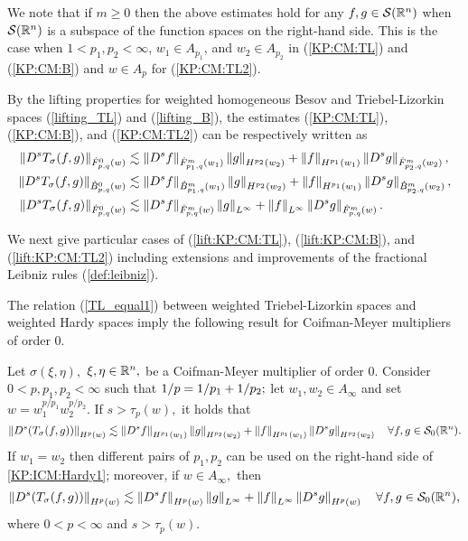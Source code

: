 We note that if $m\geq 0$ then the above estimates hold for any $f,g\in\sw$ when $\sw$ is a subspace of the function spaces on the right-hand side. This is the case when $1<p_1,p_2<\infty$, $w_1\in A_{p_1}$, and $w_2\in A_{p_2}$ in (\ref{KP:CM:TL}) and (\ref{KP:CM:B}) and $w\in A_p$ for (\ref{KP:CM:TL2}). 

By the lifting properties for weighted homogeneous Besov and Triebel-Lizorkin spaces (\ref{lifting_TL}) and (\ref{lifting_B}), the estimates (\ref{KP:CM:TL}), (\ref{KP:CM:B}), and (\ref{KP:CM:TL2}) can be respectively written as
\begin{align}
\norm{D^s T_\sigma(f,g)}{\tlw{p}{0}{q}{w}} & \lesssim \norm{D^s f}{\tlw{p_1}{m}{q}{w_1} } \norm{g}{H^{p_2}(w_2)} +  \norm{f}{H^{p_1}(w_1)}   \norm{D^s g}{\tlw{p_2}{m}{q}{w_2} }, \label{lift:KP:CM:TL}  \\
\norm{D^s T_\sigma(f,g)}{\besw{p}{0}{q}{w}} & \lesssim \norm{D^s f}{\besw{p_1}{m}{q}{w_1} } \norm{g}{H^{p_2}(w_2)} +  \norm{f}{H^{p_1}(w_1)}   \norm{D^s g}{\besw{p_2}{m}{q}{w_2} }, \label{lift:KP:CM:B} \\
\norm{D^s T_\sigma(f,g)}{\tlw{p}{0}{q}{w}} & \lesssim \norm{D^s f}{\tlw{p}{m}{q}{w} } \norm{g}{L^\infty} +  \norm{f}{L^\infty}   \norm{D^s g}{\tlw{p}{m}{q}{w}}. \label{lift:KP:CM:TL2}
\end{align}


We next give particular cases of (\ref{lift:KP:CM:TL}), (\ref{lift:KP:CM:B}), and (\ref{lift:KP:CM:TL2}) including extensions and  improvements of the fractional Leibniz rules (\ref{def:leibniz}).

The relation (\ref{TL_equal1}) between weighted Triebel-Lizorkin spaces and weighted Hardy spaces imply the following result for Coifman-Meyer multipliers of order 0.
\begin{corollary}\label{coro:KP:ICM:Hardy}  Let $\sigma(\xi,\eta),$ $\xi,\eta\in\rn,$ be a Coifman-Meyer multiplier of order $0.$ 
Consider  $0 < p, p_1, p_2  < \infty$  such that $\hcline;$ let  $w_1,w_2\in A_\infty$ and set $w=w_1^{{p}/{p_1}} w_2^{{p}/{p_2}}.$ 
If  $s > \tau_p(w),$ it holds that
\begin{equation}\label{KP:ICM:Hardy1}
\norm{D^s(T_\sigma(f,g))}{H^p(w)} \lesssim \norm{D^s f}{H^{p_1}(w_1)} \norm{g}{H^{p_2}(w_2)} +  \norm{f}{H^{p_1}(w_1)}   \norm{D^s g}{H^{p_2}(w_2)} \quad \forall f, g \in \swz.
\end{equation}
If $w_1=w_2$ then different pairs of $p_1, p_2$ can be used on the right-hand side of \eqref{KP:ICM:Hardy1}; moreover, if $w\in A_\infty,$ then 
\begin{equation}\label{Kp:ICM:Hardy2}
\norm{D^s(T_\sigma(f,g))}{H^p(w)} \lesssim \norm{D^s f}{H^{p}(w)} \norm{g}{L^\infty} +  \norm{f}{L^\infty}   \norm{D^s g}{H^{p}(w)} \quad \forall f, g \in \swz,
\end{equation}
where $0<p<\infty$ and $s>\tau_{p}(w).$

\end{corollary}

